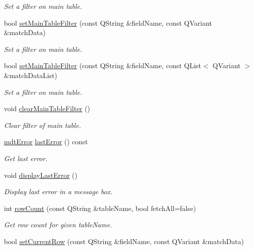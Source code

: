 \begin{DoxyCompactItemize}
\begin{DoxyCompactList}\small\item\em Set a filter on main table. \end{DoxyCompactList}\item 
bool \hyperlink{classmdt_sql_form_abfc6d7f49debf02f5016923cbd422f2f}{set\-Main\-Table\-Filter} (const Q\-String \&field\-Name, const Q\-Variant \&match\-Data)
\begin{DoxyCompactList}\small\item\em Set a filter on main table. \end{DoxyCompactList}\item 
bool \hyperlink{classmdt_sql_form_a61c0a1a4a2c53ca5571168e9761adff8}{set\-Main\-Table\-Filter} (const Q\-String \&field\-Name, const Q\-List$<$ Q\-Variant $>$ \&match\-Data\-List)
\begin{DoxyCompactList}\small\item\em Set a filter on main table. \end{DoxyCompactList}\item 
void \hyperlink{classmdt_sql_form_a37cd63844276e50bda58fe8edafc704e}{clear\-Main\-Table\-Filter} ()
\begin{DoxyCompactList}\small\item\em Clear filter of main table. \end{DoxyCompactList}\item 
\hyperlink{classmdt_error}{mdt\-Error} \hyperlink{classmdt_sql_form_a04724293298421c404e93c58015cda5e}{last\-Error} () const 
\begin{DoxyCompactList}\small\item\em Get last error. \end{DoxyCompactList}\item 
void \hyperlink{classmdt_sql_form_a7521d231f24663ee1d2acb904387353b}{display\-Last\-Error} ()
\begin{DoxyCompactList}\small\item\em Display last error in a message box. \end{DoxyCompactList}\item 
int \hyperlink{classmdt_sql_form_a533d58efc54f9ecc180467cd13b8e511}{row\-Count} (const Q\-String \&table\-Name, bool fetch\-All=false)
\begin{DoxyCompactList}\small\item\em Get row count for given table\-Name. \end{DoxyCompactList}\item 
bool \hyperlink{classmdt_sql_form_a268cedc485a92877a551cee34cf0eecc}{set\-Current\-Row} (const Q\-String \&field\-Name, const Q\-Variant \&match\-Data)

\end{DoxyCompactItemize}
